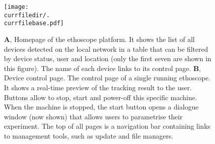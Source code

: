 \begin{figure}[h!]
  \centering   
   \texttt{[image: \\currfiledir/.\\currfilebase.pdf]}
  \caption[The user interface]{
  	\textbf{A}, Homepage of the ethoscope platform. 
  	It shows the list of all devices detected on the local network in a table that can be filtered by device status, user and location (only the first seven are shown in this figure). 
	The name of each device links to its control page.
  	\textbf{B}, Device control page. 
	The control page of a single running ethoscope. 
	It shows a real-time preview of the tracking result to the user. 
	Buttons allow to stop, start and power-off this specific machine.
	When the machine is stopped, the start button opens a dialogue window (now shown) that allows users
	to parametrise their experiment.
	The top of all pages is a navigation bar containing links to management tools, such as update and file managers.
  \label{fig:\currfilebase}
  }
\end{figure}




